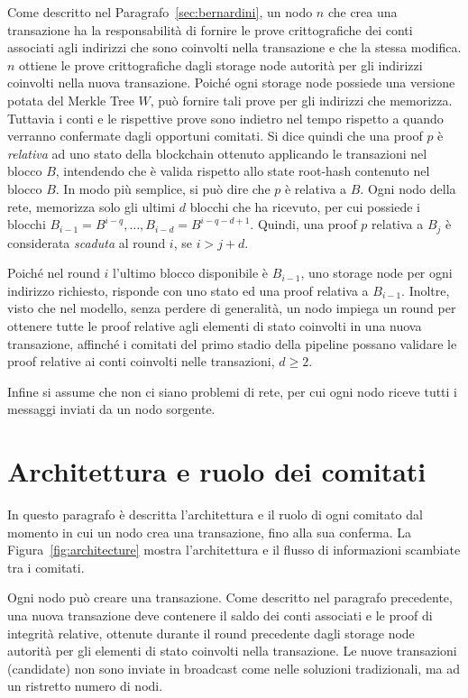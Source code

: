 Come descritto nel Paragrafo~\ref{sec:bernardini}, un nodo $n$ che crea una transazione ha la responsabilità di fornire le prove crittografiche dei conti associati agli indirizzi che sono coinvolti nella transazione e che la stessa modifica. $n$ ottiene le prove crittografiche dagli storage node autorità per gli indirizzi coinvolti nella nuova transazione. Poiché ogni storage node possiede una versione potata del Merkle Tree $W$, può fornire tali prove per gli indirizzi che memorizza. Tuttavia i conti e le rispettive prove sono indietro nel tempo rispetto a quando verranno confermate dagli opportuni comitati. Si dice quindi che una proof $p$ è \emph{relativa} ad uno stato della blockchain ottenuto applicando le transazioni nel blocco $B$, intendendo che è valida rispetto allo state root-hash contenuto nel blocco $B$. In modo più semplice, si può dire che $p$ è relativa a $B$.
Ogni nodo della rete, memorizza solo gli ultimi $d$ blocchi che ha ricevuto, per cui possiede i blocchi $B_{i-1}=B^{i-q}, \dots, B_{i-d}=B^{i-q-d+1}$. Quindi, una proof $p$ relativa a $B_j$ è considerata \emph{scaduta} al round $i$, se $i > j + d$.

Poiché nel round $i$ l'ultimo blocco disponibile è $B_{i-1}$, uno storage node per ogni indirizzo richiesto, risponde con uno stato ed una proof relativa a $B_{i-1}$. Inoltre, visto che nel modello, senza perdere di generalità, un nodo impiega un round per ottenere tutte le proof relative agli elementi di stato coinvolti in una nuova transazione, affinché i comitati del primo stadio della pipeline possano validare le proof relative ai conti coinvolti nelle transazioni, $d \geq 2$.

Infine si assume che non ci siano problemi di rete, per cui ogni nodo riceve tutti i messaggi inviati da un nodo sorgente.

\section{Architettura e ruolo dei comitati}\label{sec:architettura}

In questo paragrafo è descritta l'architettura e il ruolo di ogni comitato dal momento in cui un nodo crea una transazione, fino alla sua conferma. La Figura~\ref{fig:architecture} mostra l'architettura e il flusso di informazioni scambiate tra i comitati.

Ogni nodo può creare una transazione. Come descritto nel paragrafo precedente, una nuova transazione deve contenere il saldo dei conti associati e le proof di integrità relative, ottenute durante il round precedente dagli storage node autorità per gli elementi di stato coinvolti nella transazione. Le nuove transazioni (candidate) non sono inviate in broadcast come nelle soluzioni tradizionali, ma ad un ristretto numero di nodi.

